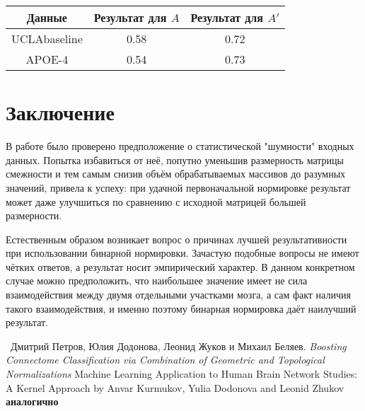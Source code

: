 \documentclass{urticle}
\newcommand{\mys}[1]{\newpage\section*{#1}}
\begin{document}
\begin{center}
\begin{tabular}[t]{|c|c|c|}
\hline
	Данные & Результат для $A$ & Результат для $A'$ \\
\hline
	UCLAbaseline & 0.58 & 0.72 \\
\hline
	APOE-4 & 0.54 & 0.73 \\
\hline
\end{tabular}
\end{center}

\mys{Заключение}
В работе было проверено предположение о статистической "шумности" входных данных. Попытка избавиться от неё, попутно уменьшив размерность матрицы смежности и тем самым снизив объём обрабатываемых массивов до разумных значений, привела к успеху: при удачной первоначальной нормировке результат может даже улучшиться по сравнению с исходной матрицей большей размерности.

Естественным образом возникает вопрос о причинах лучшей результативности при использовании бинарной нормировки. Зачастую подобные вопросы не имеют чётких ответов, а результат носит эмпирический характер. В данном конкретном случае можно предположить,  что наибольшее значение имеет не сила взаимодействия между двумя отдельными участками мозга, а сам факт наличия такого взаимодействия, и именно поэтому бинарная нормировка даёт наилучший результат.


\begin{thebibliography}{2}
  Дмитрий Петров, Юлия Додонова, Леонид Жуков и Михаил Беляев. \textit{Boosting Connectome Classification via Combination of Geometric and Topological Normalizations}
 Machine Learning Application to Human Brain Network Studies: A Kernel Approach by Anvar Kurmukov, Yulia Dodonova and Leonid Zhukov \textbf{аналогично}
\end{thebibliography}
\end{document}
